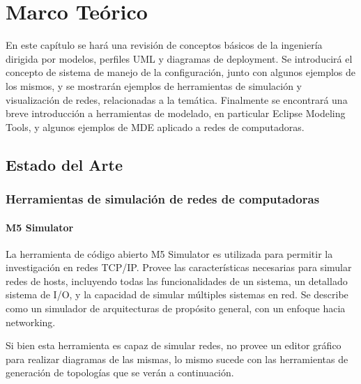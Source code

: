 \chapter{Marco Teórico} \label{Marco Teorico}

En este capítulo se hará una revisión de conceptos básicos de la ingeniería dirigida por modelos, perfiles UML y diagramas de deployment. Se introducirá el concepto de sistema de manejo de la configuración, junto con algunos ejemplos de los mismos, y se mostrarán ejemplos de herramientas de simulación y visualización de redes, relacionadas a la temática. Finalmente se encontrará una breve introducción a herramientas de modelado, en particular Eclipse Modeling Tools, y algunos ejemplos de MDE aplicado a redes de computadoras.

\section{Estado del Arte}
\subsection{Herramientas de simulación de redes de computadoras} \label{Herramientas de simulación}
\subsubsection{M5 Simulator}
La herramienta de código abierto M5 Simulator es utilizada para permitir la investigación en redes TCP/IP. Provee las características necesarias para simular redes de hosts, incluyendo todas las funcionalidades de un sistema, un detallado sistema de I/O, y la capacidad de simular múltiples sistemas en red.
Se describe como un simulador de arquitecturas de propósito general, con un enfoque hacia networking. \cite{binkert2006m5}

Si bien esta herramienta es capaz de simular redes, no provee un editor gráfico para realizar diagramas de las mismas, lo mismo sucede con las herramientas de generación de topologías que se verán a continuación.
